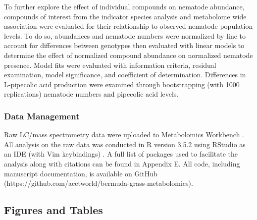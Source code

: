 \documentclass[9pt,lineno]{elife}
\begin{document}
To further explore the effect of individual compounds on nematode abundance, compounds of interest from the indicator species analysis and metabolome wide association were evaluated for their relationship to observed nematode population levels.  To do so, abundances and nematode numbers were normalized by line to account for differences between genotypes then evaluated with linear models to determine the effect of normalized compound abundance on normalized nematode presence. Model fits were evaluated with information criteria, residual examination, model significance, and coefficient of determination.  Differences in L-pipecolic acid production were examined through bootstrapping (with 1000 replications) nematode numbers and pipecolic acid levels.  


\subsubsection{Data Management}

Raw LC/mass spectrometry data were uploaded to Metabolomics Workbench \citep{sud2015metabolomics}.  All analysis on the raw data was conducted in R version 3.5.2 using RStudio as an IDE (with Vim keybindings) \citep{rcore2018,rstudio}.  A full list of packages used to facilitate the analysis along with citations can be found in Appendix E.  All code, including manuscript documentation, is available on GitHub (https://github.com/acetworld/bermuda-grass-metabolomics).  



\subsection{Figures and Tables}
\end{document}
